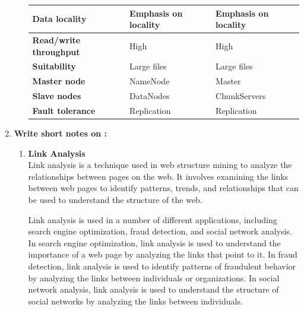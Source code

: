 \documentclass[12pt]{article}
\begin{document}
\begin{enumerate}
\begin{enumerate}
\begin{longtable}{|L{3cm}|L{5cm}|L{5cm}|}
            \hline
            \textbf{Data locality} & Emphasis on locality & Emphasis on locality \\
            \hline
            \textbf{Read/write throughput} & High & High \\
            \hline
            \textbf{Suitability} & Large files & Large files \\
            \hline
            \textbf{Master node} & NameNode & Master \\
            \hline
            \textbf{Slave nodes} & DataNodes & ChunkServers \\
            \hline
            \textbf{Fault tolerance} & Replication & Replication \\
            \hline
            \end{longtable}
    \end{enumerate}

    \item {\bfseries Write short notes on :} 
    \begin{enumerate}
        \item {\bfseries Link Analysis\\}
        Link analysis is a technique used in web structure mining to analyze the relationships between pages on the web. It involves examining the links between web pages to identify patterns, trends, and relationships that can be used to understand the structure of the web.

Link analysis is used in a number of different applications, including search engine optimization, fraud detection, and social network analysis. In search engine optimization, link analysis is used to understand the importance of a web page by analyzing the links that point to it. In fraud detection, link analysis is used to identify patterns of fraudulent behavior by analyzing the links between individuals or organizations. In social network analysis, link analysis is used to understand the structure of social networks by analyzing the links between individuals.


\end{enumerate}
\end{enumerate}
\end{document}
